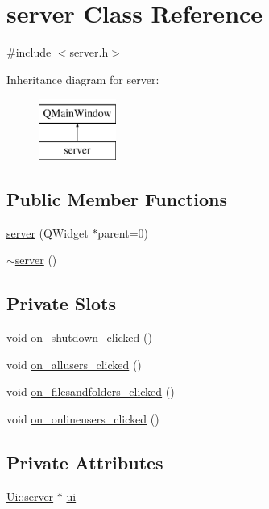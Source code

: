 \hypertarget{classserver}{\section{server Class Reference}
\label{classserver}
}


{\ttfamily \#include $<$server.\-h$>$}

Inheritance diagram for server\-:\begin{figure}[H]
\begin{center}
\leavevmode
\includegraphics[height=2.000000cm]{classserver}
\end{center}
\end{figure}
\subsection*{Public Member Functions}
\begin{DoxyCompactItemize}
\item 
\hyperlink{classserver_a428916320f02427c57ffc8ac590264ec}{server} (Q\-Widget $\ast$parent=0)
\item 
\hyperlink{classserver_ae3de4182db6fe6c656036f9e4da49204}{$\sim$server} ()
\end{DoxyCompactItemize}
\subsection*{Private Slots}
\begin{DoxyCompactItemize}
\item 
void \hyperlink{classserver_af1fe8025a1a0c244cf90bc1e90176c8a}{on\-\_\-shutdown\-\_\-clicked} ()
\item 
void \hyperlink{classserver_aec55d1db226f4c6e834209636ad04874}{on\-\_\-allusers\-\_\-clicked} ()
\item 
void \hyperlink{classserver_a227dc8fe1d127cc88ac278bfd47afffc}{on\-\_\-filesandfolders\-\_\-clicked} ()
\item 
void \hyperlink{classserver_aee45026c935d220ae026d03b9bd9730f}{on\-\_\-onlineusers\-\_\-clicked} ()
\end{DoxyCompactItemize}
\subsection*{Private Attributes}
\begin{DoxyCompactItemize}
\item 
\hyperlink{classUi_1_1server}{Ui\-::server} $\ast$ \hyperlink{classserver_a5f9b71996aa0f4d112b6ecbb973883fd}{ui}
\end{DoxyCompactItemize}



